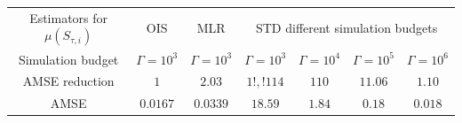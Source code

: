 \begin{tabular}{c|cc|cccc}
\toprule
Estimators for $\mu(S_{\tau,i})$& OIS & MLR & \multicolumn{4}{|c}{STD different simulation budgets}   \\
Simulation budget & $\boxed{\Gamma = 10^3}$ & $\boxed{\Gamma = 10^3}$ & $\boxed{\Gamma = 10^3}$& $\Gamma = 10^4$ & $\Gamma = 10^5$ & $\Gamma = 10^6$   \\
\midrule
AMSE reduction & $\boxed{1}$ & $\boxed{2.03}$ & $\boxed{1!,!114}$ & $110$ & $11.06$ & $1.10$  \\
AMSE & $0.0167$ & $0.0339$ & $18.59$ & $1.84$ & $0.18$ & $0.018$  \\
\bottomrule
\end{tabular}
